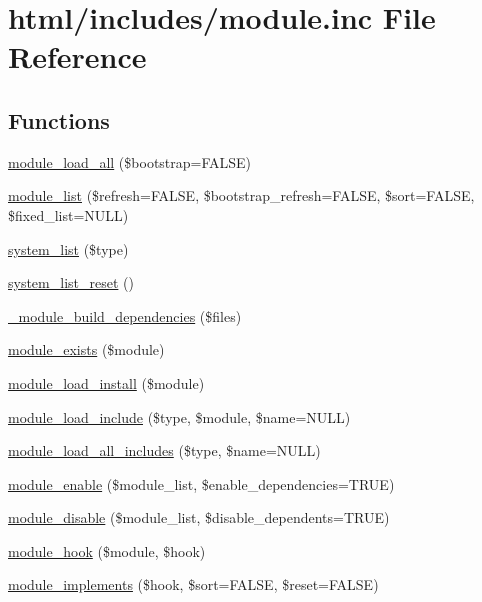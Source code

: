 \hypertarget{module_8inc}{
\section{html/includes/module.inc File Reference}
\label{module_8inc}
}
\subsection*{Functions}
\begin{DoxyCompactItemize}
\item 
\hyperlink{module_8inc_a76db4bd7c4962f254d6cc9bed5f0e1f6}{module\_\-load\_\-all} (\$bootstrap=FALSE)
\item 
\hyperlink{module_8inc_ad4ef444bbb8e56724e12908cf9b6e1aa}{module\_\-list} (\$refresh=FALSE, \$bootstrap\_\-refresh=FALSE, \$sort=FALSE, \$fixed\_\-list=NULL)
\item 
\hyperlink{module_8inc_a807821e98f8d626a7043923080ba6438}{system\_\-list} (\$type)
\item 
\hyperlink{module_8inc_ac141d5e0a5817eda15b376a5737dec3d}{system\_\-list\_\-reset} ()
\item 
\hyperlink{module_8inc_a4a43fd8278bb4e660eff9a74aaba3dd4}{\_\-module\_\-build\_\-dependencies} (\$files)
\item 
\hyperlink{module_8inc_a83bfe4eac372da50ff3eaf949b1b6ff8}{module\_\-exists} (\$module)
\item 
\hyperlink{module_8inc_a77a6101f363c066eafbe29b26af5bfd3}{module\_\-load\_\-install} (\$module)
\item 
\hyperlink{module_8inc_a49098ed4d33650ee5ab52aab40982423}{module\_\-load\_\-include} (\$type, \$module, \$name=NULL)
\item 
\hyperlink{module_8inc_a4e2123e44529b4d307fc1ac78519e966}{module\_\-load\_\-all\_\-includes} (\$type, \$name=NULL)
\item 
\hyperlink{module_8inc_a4b2c9ea60d7c88595eaebfc4abd5f1bf}{module\_\-enable} (\$module\_\-list, \$enable\_\-dependencies=TRUE)
\item 
\hyperlink{module_8inc_a0378d5f56db255c18ca59fc54cd52a94}{module\_\-disable} (\$module\_\-list, \$disable\_\-dependents=TRUE)
\item 
\hyperlink{group__hooks_ga0d7a0b03039c561b63424b2a6cf6103f}{module\_\-hook} (\$module, \$hook)
\item 
\hyperlink{group__hooks_ga9191200072f2a641829e9d3c2759561f}{module\_\-implements} (\$hook, \$sort=FALSE, \$reset=FALSE)
\item 

\end{DoxyCompactItemize}
